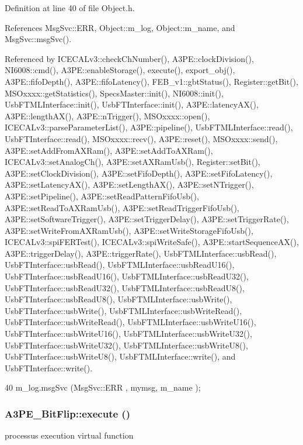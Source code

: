 Definition at line 40 of file Object.h.

References MsgSvc::ERR, Object::m\_\-log, Object::m\_\-name, and MsgSvc::msgSvc().

Referenced by ICECALv3::checkChNumber(), A3PE::clockDivision(), NI6008::cmd(), A3PE::enableStorage(), execute(), export\_\-obj(), A3PE::fifoDepth(), A3PE::fifoLatency(), FEB\_\-v1::gbtStatus(), Register::getBit(), MSOxxxx::getStatistics(), SpecsMaster::init(), NI6008::init(), UsbFTMLInterface::init(), UsbFTInterface::init(), A3PE::latencyAX(), A3PE::lengthAX(), A3PE::nTrigger(), MSOxxxx::open(), ICECALv3::parseParameterList(), A3PE::pipeline(), UsbFTMLInterface::read(), UsbFTInterface::read(), MSOxxxx::recv(), A3PE::reset(), MSOxxxx::send(), A3PE::setAddFromAXRam(), A3PE::setAddToAXRam(), ICECALv3::setAnalogCh(), A3PE::setAXRamUsb(), Register::setBit(), A3PE::setClockDivision(), A3PE::setFifoDepth(), A3PE::setFifoLatency(), A3PE::setLatencyAX(), A3PE::setLengthAX(), A3PE::setNTrigger(), A3PE::setPipeline(), A3PE::setReadPatternFifoUsb(), A3PE::setReadToAXRamUsb(), A3PE::setReadTriggerFifoUsb(), A3PE::setSoftwareTrigger(), A3PE::setTriggerDelay(), A3PE::setTriggerRate(), A3PE::setWriteFromAXRamUsb(), A3PE::setWriteStorageFifoUsb(), ICECALv3::spiFERTest(), ICECALv3::spiWriteSafe(), A3PE::startSequenceAX(), A3PE::triggerDelay(), A3PE::triggerRate(), UsbFTMLInterface::usbRead(), UsbFTInterface::usbRead(), UsbFTMLInterface::usbReadU16(), UsbFTInterface::usbReadU16(), UsbFTMLInterface::usbReadU32(), UsbFTInterface::usbReadU32(), UsbFTMLInterface::usbReadU8(), UsbFTInterface::usbReadU8(), UsbFTMLInterface::usbWrite(), UsbFTInterface::usbWrite(), UsbFTMLInterface::usbWriteRead(), UsbFTInterface::usbWriteRead(), UsbFTMLInterface::usbWriteU16(), UsbFTInterface::usbWriteU16(), UsbFTMLInterface::usbWriteU32(), UsbFTInterface::usbWriteU32(), UsbFTMLInterface::usbWriteU8(), UsbFTInterface::usbWriteU8(), UsbFTMLInterface::write(), and UsbFTInterface::write().


\begin{DoxyCode}
40 { m_log.msgSvc (MsgSvc::ERR     , mymsg, m_name ); }
\end{DoxyCode}
\hypertarget{classA3PE__BitFlip_affa7320fb39001a6e9b5696542fe4584}{
\subsubsection[{execute}]{ A3PE\_\-BitFlip::execute ()}}
\label{classA3PE__BitFlip_affa7320fb39001a6e9b5696542fe4584}
processus execution virtual function 

